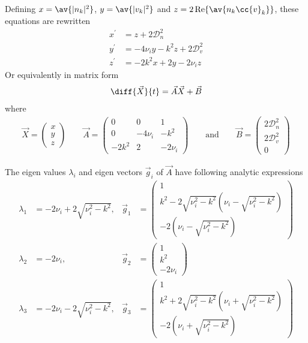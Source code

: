 \documentclass[10pt,a4paper]{article}
\newcommand{\src}{\ensuremath{\mathcal{D}}}
\begin{document}
Defining  $x=\av{|n_k|^2}$, $y=\av{|v_k|^2}$ and $z=2\Re\av{n_k\cc{v}_k}$, these equations
are rewritten 
\begin{align*}
x^\prime&=z+2\src_n^2\\
y^\prime&=-4\nu_iy-k^2z+2\src_v^2\\
z^\prime&=-2k^2x+2y-2\nu_iz
\end{align*}
Or equivalently in matrix form
\begin{align}
\diff{\vec{X}}{t}=\vec{A}\vec{X}+\vec{B}
\end{align}
where
\begin{align}
\vec{X}=\left(\begin{array}{c}x\\y\\z\end{array}\right)\qquad
\vec{A}=\left(\begin{array}{ccc}
0&0&1\\0&{-}4\nu_i&{-}k^2\\{-}2k^2&2&-2\nu_i\end{array}\right)
\qquad\mbox{and}\qquad
\vec{B}=\left(\begin{array}{c}2\src_n^2\\2\src_v^2\\0\end{array}\right)\nonumber
\end{align}

The eigen values $\lambda_i$ and eigen vectors $\vec{g}_i$ of $\vec{A}$ have following analytic
expressions 
\begin{align*}
\lambda_1 &= -2\nu_i{+}2\sqrt{\nu_i^2{-}k^2}, &
\vec{g}_1 & = \left(\begin{array}{l}1\\
k^2{-}2\sqrt{\nu_i^2{-}k^2}\left(\nu_i{-}\sqrt{\nu_i^2{-}k^2}\right)\\
-2\left(\nu_i{-}\sqrt{\nu_i^2-k^2}\right)\end{array}\right)\\
\lambda_2 &= -2\nu_i, &
\vec{g}_2 & = \left(\begin{array}{l}1\\k^2\\-2\nu_i\end{array}\right)\\
\lambda_3 &= -2\nu_i{-}2\sqrt{\nu_i^2{-}k^2}, &
\vec{g}_3 & = \left(\begin{array}{l}1\\
k^2{+}2\sqrt{\nu_i^2{-}k^2}\left(\nu_i{+}\sqrt{\nu_i^2{-}k^2}\right)\\
-2\left(\nu_i{+}\sqrt{\nu_i^2{-}k^2}\right)\end{array}\right)
\end{align*}
\end{document}
